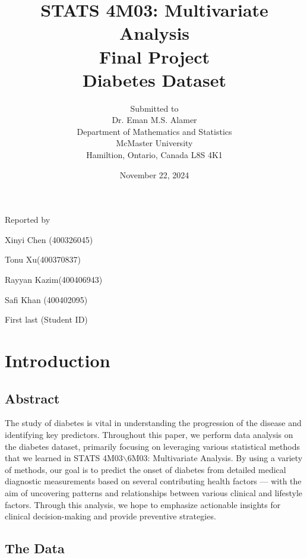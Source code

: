 \documentclass[12pt]{article}
\begin{document}
\title{STATS 4M03: Multivariate Analysis\\ Final Project \\ Diabetes Dataset }

\author{Submitted to\\ Dr. Eman M.S. Alamer 
\\Department of Mathematics and Statistics
\\McMaster University\\Hamiltion, Ontario, Canada L8S 4K1}
\date {November 22, 2024}


\maketitle

 \centerline{Reported by}
 \centerline{Xinyi Chen (400326045)}
  \centerline{Tonu Xu(400370837)}
   \centerline{Rayyan Kazim(400406943)}
    \centerline{Safi Khan (400402095)}
     \centerline{First last (Student ID)}


\newpage
\section{Introduction}
\subsection{Abstract}



\begin{indent} 
\onehalfspacing	
	
The study of diabetes is vital in understanding the progression of the disease and identifying key predictors. Throughout this paper, we perform data analysis on the diabetes dataset, primarily focusing on leveraging various statistical methods that we learned in STATS 4M03$\backslash$6M03: Multivariate Analysis. By using a variety of methods, our goal is to predict the onset of diabetes from detailed medical diagnostic measurements based on several contributing health factors --- with the aim of uncovering patterns and relationships between various clinical and lifestyle factors. Through this analysis, we hope to emphasize actionable insights for clinical decision-making and provide preventive strategies. 
\end{indent}

\subsection{The Data}
\end{document}
